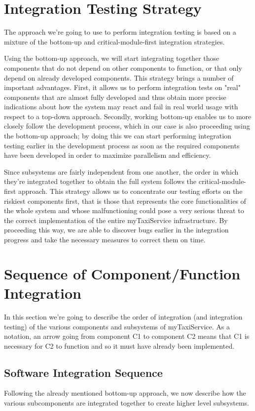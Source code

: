 \section{Integration Testing Strategy}
The approach we're going to use to perform integration testing is based on a mixture of the bottom-up and critical-module-first integration strategies.

Using the bottom-up approach, we will start integrating together those components that do not depend on other components to function, or that only depend on already developed components. This strategy brings a number of important advantages. First, it allows us to perform integration tests on "real" components that are almost fully developed and thus obtain more precise indications about how the system may react and fail in real world usage with respect to a top-down approach. Secondly, working bottom-up enables us to more closely follow the development process, which in our case is also proceeding using the bottom-up approach; by doing this we can start performing integration testing earlier in the development process as soon as the required components have been developed in order to maximize parallelism and efficiency.

Since subsystems are fairly independent from one another, the order in which they're integrated together to obtain the full system follows the critical-module-first approach. This strategy allows us to concentrate our testing efforts on the riskiest components first, that is those that represents the core functionalities of the whole system and whose malfunctioning could pose a very serious threat to the correct implementation of the entire myTaxiService infrastructure. By proceeding this way, we are able to discover bugs earlier in the integration progress and take the necessary measures to correct them on time.
\section{Sequence of Component/Function Integration}
In this section we're going to describe the order of integration (and integration testing) of the various components and subsystems of myTaxiService. As a notation, an arrow going from component C1 to component C2 means that C1 is necessary for C2 to function and so it must have already been implemented. 
\subsection{Software Integration Sequence}
Following the already mentioned bottom-up approach, we now describe how the various subcomponents are integrated together to create higher level subsystems. 
